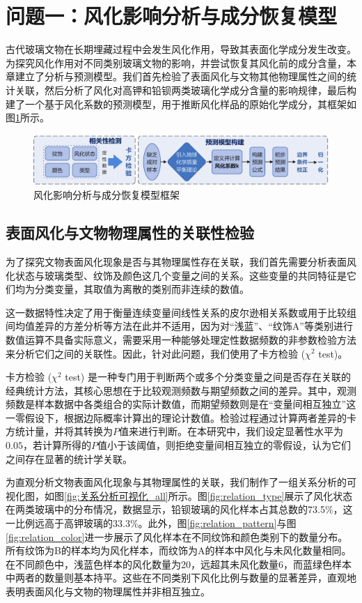 \section{问题一：风化影响分析与成分恢复模型}

古代玻璃文物在长期埋藏过程中会发生风化作用，导致其表面化学成分发生改变。为探究风化作用对不同类别玻璃文物的影响，并尝试恢复其风化前的成分含量，本章建立了分析与预测模型。我们首先检验了表面风化与文物其他物理属性之间的统计关联，然后分析了风化对高钾和铅钡两类玻璃化学成分含量的影响规律，最后构建了一个基于风化系数的预测模型，用于推断风化样品的原始化学成分，其框架如图\ref{fig:问题一模型框架}所示。

\begin{figure}[H]
	\centering
	\includegraphics[width=\textwidth]{figs/3问题一/第一问框架.pdf}
	\caption{风化影响分析与成分恢复模型框架}
	\label{fig:问题一模型框架}
\end{figure}

\subsection{表面风化与文物物理属性的关联性检验}

为了探究文物表面风化现象是否与其物理属性存在关联，我们首先需要分析表面风化状态与玻璃类型、纹饰及颜色这几个变量之间的关系。这些变量的共同特征是它们均为分类变量，其取值为离散的类别而非连续的数值。

这一数据特性决定了用于衡量连续变量间线性关系的皮尔逊相关系数或用于比较组间均值差异的方差分析等方法在此并不适用，因为对“浅蓝”、“纹饰A”等类别进行数值运算不具备实际意义，需要采用一种能够处理定性数据频数的非参数检验方法来分析它们之间的关联性。因此，针对此问题，我们使用了卡方检验 ($\chi^{2}$ test)。

卡方检验 ($\chi^{2}$ test) 是一种专门用于判断两个或多个分类变量之间是否存在关联的经典统计方法，其核心思想在于比较观测频数与期望频数之间的差异。其中，观测频数是样本数据中各类组合的实际计数值，而期望频数则是在“变量间相互独立”这一零假设下，根据边际概率计算出的理论计数值。检验过程通过计算两者差异的卡方统计量，并将其转换为$P$值来进行判断。在本研究中，我们设定显著性水平为$0.05$，若计算所得的$P$值小于该阈值，则拒绝变量间相互独立的零假设，认为它们之间存在显著的统计学关联。

为直观分析文物表面风化现象与其物理属性的关联，我们制作了一组关系分析的可视化图，如图\ref{fig:关系分析可视化_all}所示。图\ref{fig:relation_type}展示了风化状态在两类玻璃中的分布情况，数据显示，铅钡玻璃的风化样本占其总数的73.5\%，这一比例远高于高钾玻璃的33.3\%。此外，图\ref{fig:relation_pattern}与图\ref{fig:relation_color}进一步展示了风化样本在不同纹饰和颜色类别下的数量分布。所有纹饰为B的样本均为风化样本，而纹饰为A的样本中风化与未风化数量相同。在不同颜色中，浅蓝色样本的风化数量为20，远超其未风化数量6，而蓝绿色样本中两者的数量则基本持平。这些在不同类别下风化比例与数量的显著差异，直观地表明表面风化与文物的物理属性并非相互独立。

